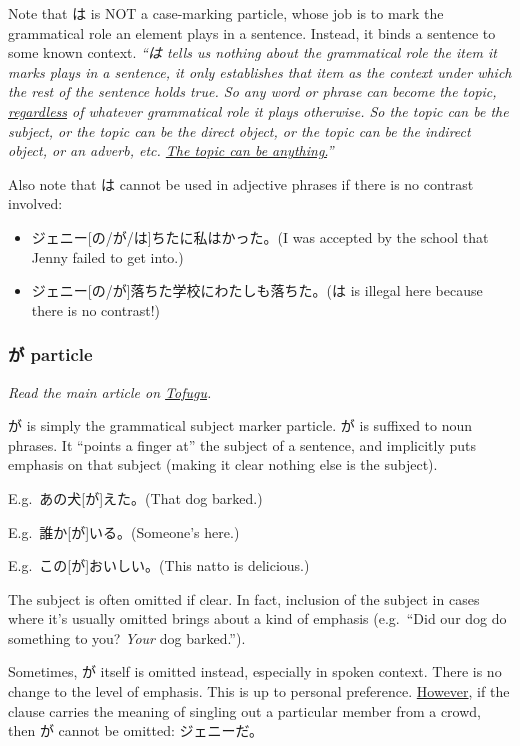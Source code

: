 \documentclass[../nihongo-gakushuu-kyouzai.tex]{subfiles}
\begin{document}
Note that は is NOT a case-marking particle, whose job is to mark the grammatical role an element plays in a sentence. Instead, it binds a sentence to some known context. \emph{``は tells us nothing about the grammatical role the item it marks plays in a sentence, it only establishes that item as the context under which the rest of the sentence holds true. So any word or phrase can become the topic, \ul{regardless} of whatever grammatical role it plays otherwise. So the topic can be the subject, or the topic can be the direct object, or the topic can be the indirect object, or an adverb, etc. \ul{The topic can be anything.}''}

Also note that は cannot be used in adjective phrases if there is no contrast involved:
\begin{itemize}
    \item ジェニー[の/が/は]ちたに私はかった。(I was accepted by the school that Jenny failed to get into.)
    \item ジェニー[の/が]落ちた学校にわたしも落ちた。(は is illegal here because there is no contrast!)
\end{itemize}

\subsubsection{が particle}
\emph{Read the main article on \href{https://www.tofugu.com/japanese-grammar/particle-ga/}{Tofugu}.}


が is simply the grammatical subject marker particle. が is suffixed to noun phrases. It ``points a finger at'' the subject of a sentence, and implicitly puts emphasis on that subject (making it clear nothing else is the subject).

E.g.\ あの犬[が]えた。(That dog barked.)

E.g.\ 誰か[が]いる。(Someone's here.)

E.g.\ この[が]おいしい。(This natto is delicious.)


The subject is often omitted if clear. In fact, inclusion of the subject in cases where it's usually omitted brings about a kind of emphasis (e.g.\ ``Did our dog do something to you? \emph{Your} dog barked.'').

Sometimes, が itself is omitted instead, especially in spoken context. There is no change to the level of emphasis. This is up to personal preference. \ul{However}, if the clause carries the meaning of singling out a particular member from a crowd, then が cannot be omitted: ジェニーだ。
\end{document}
